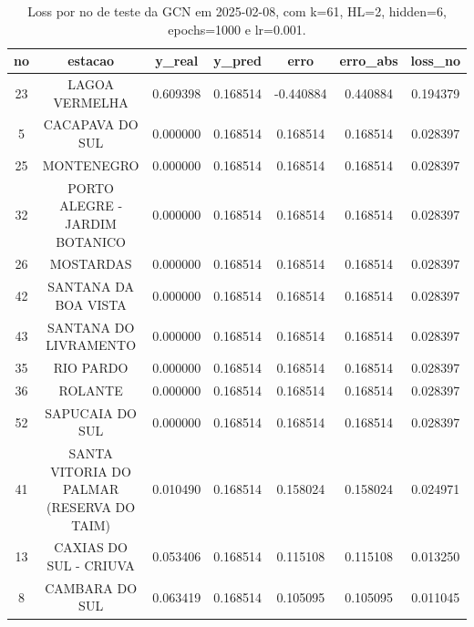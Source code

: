 \begin{table}[h]
\centering
\caption{Loss por no de teste da GCN em 2025-02-08, com k=61, HL=2, hidden=6, epochs=1000 e lr=0.001.}
\label{tab:gcn_loss_k61_hl2_h6_e1000_d20250208}
\begin{tabular}{ccccccc}
\toprule
no & estacao & y\_real & y\_pred & erro & erro\_abs & loss\_no \\
\midrule
23 & LAGOA VERMELHA & 0.609398 & 0.168514 & -0.440884 & 0.440884 & 0.194379 \\
5 & CACAPAVA DO SUL & 0.000000 & 0.168514 & 0.168514 & 0.168514 & 0.028397 \\
25 & MONTENEGRO & 0.000000 & 0.168514 & 0.168514 & 0.168514 & 0.028397 \\
32 & PORTO ALEGRE - JARDIM BOTANICO & 0.000000 & 0.168514 & 0.168514 & 0.168514 & 0.028397 \\
26 & MOSTARDAS & 0.000000 & 0.168514 & 0.168514 & 0.168514 & 0.028397 \\
42 & SANTANA DA BOA VISTA & 0.000000 & 0.168514 & 0.168514 & 0.168514 & 0.028397 \\
43 & SANTANA DO LIVRAMENTO & 0.000000 & 0.168514 & 0.168514 & 0.168514 & 0.028397 \\
35 & RIO PARDO & 0.000000 & 0.168514 & 0.168514 & 0.168514 & 0.028397 \\
36 & ROLANTE & 0.000000 & 0.168514 & 0.168514 & 0.168514 & 0.028397 \\
52 & SAPUCAIA DO SUL & 0.000000 & 0.168514 & 0.168514 & 0.168514 & 0.028397 \\
41 & SANTA VITORIA DO PALMAR (RESERVA DO TAIM) & 0.010490 & 0.168514 & 0.158024 & 0.158024 & 0.024971 \\
13 & CAXIAS DO SUL - CRIUVA & 0.053406 & 0.168514 & 0.115108 & 0.115108 & 0.013250 \\
8 & CAMBARA DO SUL & 0.063419 & 0.168514 & 0.105095 & 0.105095 & 0.011045 \\
\bottomrule
\end{tabular}
\end{table}
